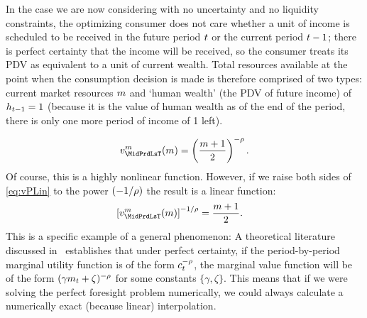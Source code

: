 \documentclass[SolvingMicroDSOPs]{subfiles}
\begin{document}
In the case we are now considering with no uncertainty and no liquidity constraints, the optimizing consumer does not care whether a unit of income is scheduled to be received in the future period $t$ or the current period $t-1$; there is perfect certainty that the income will be received, so the consumer treats its PDV as equivalent to a unit of current wealth.  Total resources available at the point when the consumption decision is made is therefore comprised of two types: current market resources $m$ and `human wealth' (the PDV of future income) of $h_{t-1}=1$ (because it is the value of human wealth as of the end of the period, there is only one more period of income of 1 left).

\begin{equation}
  \vFunc^{m}_{\MidPrdLsT}(\mNrm)  = \left(\frac{\mNrm+1}{2}\right)^{-\CRRA} \label{eq:vPLin}.
\end{equation}
Of course, this is a highly nonlinear function.  However, if we raise both sides of \eqref{eq:vPLin} to the power $(-1/\rho)$ the result is a linear function:
\begin{equation}\begin{gathered}\begin{aligned}
      \left[\vFunc^{m}_{\MidPrdLsT}(\mNrm)\right]^{-1/\CRRA}  & = \frac{\mNrm+1}{2}  .
    \end{aligned}\end{gathered}\end{equation}
This is a specific example of a general phenomenon: A theoretical literature discussed in~\cite{ckConcavity} establishes that under perfect certainty, if the period-by-period marginal utility function is of the form $c_{t}^{-\rho}$, the marginal value function will be of the form $(\gamma m_{t}+\zeta)^{-\rho}$ for some constants $\{\gamma,\zeta\}$.  This means that if we were solving the perfect foresight problem numerically, we could always calculate a numerically exact (because linear) interpolation.
\end{document}
